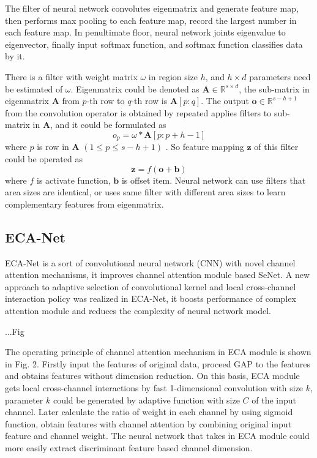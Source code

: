 \documentclass[conference]{IEEEtran}
\begin{document}
The filter of neural network convolutes eigenmatrix and generate feature map, then performs max pooling to each feature map, record the largest number in each feature map. In penultimate floor, neural network joints eigenvalue to eigenvector, finally input softmax function, and softmax function classifies data by it.

There is a filter with weight matrix $\omega$ in region size $h$, and $h \times d$ parameters need be estimated of $\omega$. Eigenmatrix could be denoted as $\boldsymbol{A} \in \mathbb{R}^{s \times d}$, the sub-matrix in eigenmatrix $\boldsymbol{A}$ from $p$-th row to $q$-th row is $\boldsymbol{A}[p : q]$. The output $\boldsymbol{o} \in \mathbb{R}^{s - h + 1}$ from the convolution operator is obtained by repeated applies filters to sub-matrix in $\boldsymbol{A}$, and it could be formulated as
\begin{equation}
	o_{p}=\omega * \boldsymbol{A}[{p}: {p}+{h}-1]
\end{equation}
where $p$ is row in $\boldsymbol{A}$ $(1 \leq {p} \leq {s} - {h} + 1)$ . So feature mapping $\boldsymbol{z}$ of this filter could be operated as
\begin{equation}
	\boldsymbol{z}=f(\boldsymbol{o}+\boldsymbol{b})
\end{equation}
where $f$ is activate function, $\boldsymbol{b}$ is offset item. Neural network can use filters that area sizes are identical, or uses same filter with different area sizes to learn complementary features from eigenmatrix.


\subsection{ECA-Net}
ECA-Net is a sort of convolutional neural network (CNN) with novel channel attention mechanisms, it improves channel attention module based SeNet. A new approach to adaptive selection of convolutional kernel and local cross-channel interaction policy was realized  in ECA-Net, it boosts performance of complex attention module and reduces the complexity of neural network model. 

...Fig

The operating principle of channel attention mechanism in ECA module is shown in Fig. 2. Firstly input the features of original data, proceed GAP to the features and obtains features without dimension reduction. On this basis, ECA module gets local cross-channel interactions by fast 1-dimensional convolution with size $k$, parameter $k$ could be generated by adaptive function with size $C$ of the input channel. Later calculate the ratio of weight in each channel by using sigmoid function, obtain features with channel attention by combining original input feature and channel weight. The neural network that takes in ECA module could more easily extract discriminant feature based channel dimension.
\end{document}

